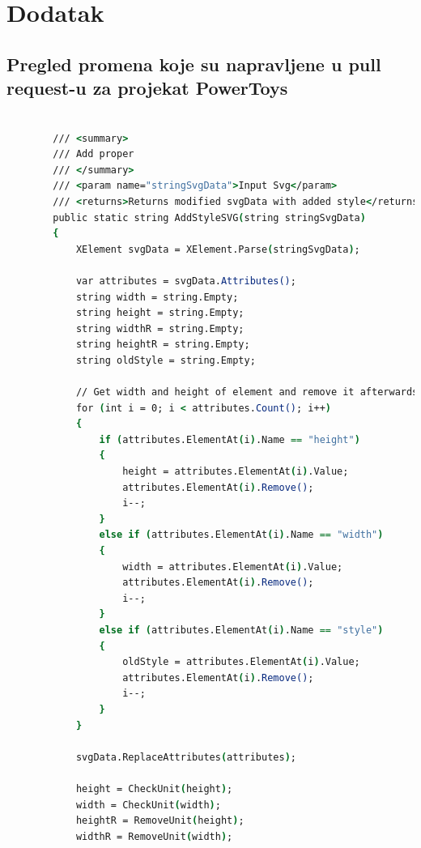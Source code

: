 \documentclass[a4paper,fleqn,12pt]{JMThesis}
\newcommand{\latin}{\fontencoding{T1}\selectfont}
\theoremstyle{plain}
\theoremstyle{definition}
\begin{document}
\ape
\chapter{Dodatak}
\section*{Pregled promena koje su napravljene u {\latin pull request}-u za projekat {\latin PowerToys}}

{\latin
\begin{center}
    \begin{lstlisting}[language=csh,caption={\latin src/modules/previewpane/SvgPreviewHandler/Utilities/SvgPreviewHandlerHelper.cs }]

        /// <summary>
        /// Add proper
        /// </summary>
        /// <param name="stringSvgData">Input Svg</param>
        /// <returns>Returns modified svgData with added style</returns>
        public static string AddStyleSVG(string stringSvgData)
        {
            XElement svgData = XElement.Parse(stringSvgData);

            var attributes = svgData.Attributes();
            string width = string.Empty;
            string height = string.Empty;
            string widthR = string.Empty;
            string heightR = string.Empty;
            string oldStyle = string.Empty;

            // Get width and height of element and remove it afterwards because it will be added inside style attribute
            for (int i = 0; i < attributes.Count(); i++)
            {
                if (attributes.ElementAt(i).Name == "height")
                {
                    height = attributes.ElementAt(i).Value;
                    attributes.ElementAt(i).Remove();
                    i--;
                }
                else if (attributes.ElementAt(i).Name == "width")
                {
                    width = attributes.ElementAt(i).Value;
                    attributes.ElementAt(i).Remove();
                    i--;
                }
                else if (attributes.ElementAt(i).Name == "style")
                {
                    oldStyle = attributes.ElementAt(i).Value;
                    attributes.ElementAt(i).Remove();
                    i--;
                }
            }

            svgData.ReplaceAttributes(attributes);

            height = CheckUnit(height);
            width = CheckUnit(width);
            heightR = RemoveUnit(height);
            widthR = RemoveUnit(width);


\end{lstlisting}
\end{center}}
\end{document}
